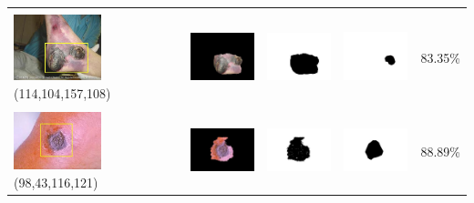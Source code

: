 \begin{table}[H]
\begin{tabular}{|m{1.0in}|m{1.0in}|m{1.0in}|m{1.0in}|m{0.6in}|}
		&  &  & \\
		\includegraphics[width=1.0in]{gambar/hasil_segmentasi/luka_hitam/image_8_rect.jpg} {\centering\fontsize{10}{10}\selectfont(114,104,157,108)}&
		\includegraphics[width=1.0in]{gambar/hasil_segmentasi/luka_hitam/result_8.jpg}&
		\includegraphics[width=1.0in]{gambar/hasil_segmentasi/luka_hitam/mask_r_8.jpg}&
		\includegraphics[width=1.0in]{gambar/hasil_segmentasi/luka_hitam/8_r.jpg}&
		83.35\% \\
		\hline
		
		&  &  & \\
		\includegraphics[width=1.0in]{gambar/hasil_segmentasi/luka_hitam/image_14_rect.jpg} {\centering\fontsize{10}{10}\selectfont(98,43,116,121)}&
		\includegraphics[width=1.0in]{gambar/hasil_segmentasi/luka_hitam/result_14.jpg}&
		\includegraphics[width=1.0in]{gambar/hasil_segmentasi/luka_hitam/mask_r_14.jpg}&
		\includegraphics[width=1.0in]{gambar/hasil_segmentasi/luka_hitam/14_r.jpg}&
		88.89\% \\
		\hline
		

\end{tabular}
\end{table}
